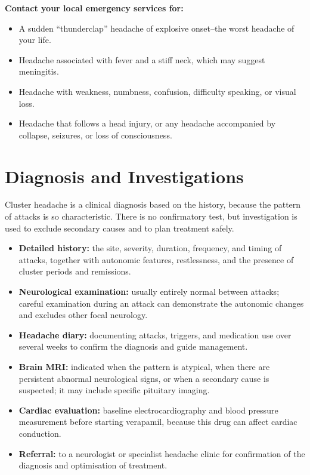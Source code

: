 \textbf{Contact your local emergency services for:}
\begin{itemize}
    \item A sudden ``thunderclap'' headache of explosive onset--the worst headache of your life.
    \item Headache associated with fever and a stiff neck, which may suggest meningitis.
    \item Headache with weakness, numbness, confusion, difficulty speaking, or visual loss.
    \item Headache that follows a head injury, or any headache accompanied by collapse, seizures, or loss of consciousness.
\end{itemize}

\section*{Diagnosis and Investigations}
Cluster headache is a clinical diagnosis based on the history, because the pattern of attacks is so characteristic. There is no confirmatory test, but investigation is used to exclude secondary causes and to plan treatment safely.
\begin{itemize}
    \item \textbf{Detailed history:} the site, severity, duration, frequency, and timing of attacks, together with autonomic features, restlessness, and the presence of cluster periods and remissions.
    \item \textbf{Neurological examination:} usually entirely normal between attacks; careful examination during an attack can demonstrate the autonomic changes and excludes other focal neurology.
    \item \textbf{Headache diary:} documenting attacks, triggers, and medication use over several weeks to confirm the diagnosis and guide management.
    \item \textbf{Brain MRI:} indicated when the pattern is atypical, when there are persistent abnormal neurological signs, or when a secondary cause is suspected; it may include specific pituitary imaging.
    \item \textbf{Cardiac evaluation:} baseline electrocardiography and blood pressure measurement before starting verapamil, because this drug can affect cardiac conduction.
    \item \textbf{Referral:} to a neurologist or specialist headache clinic for confirmation of the diagnosis and optimisation of treatment.
\end{itemize}

